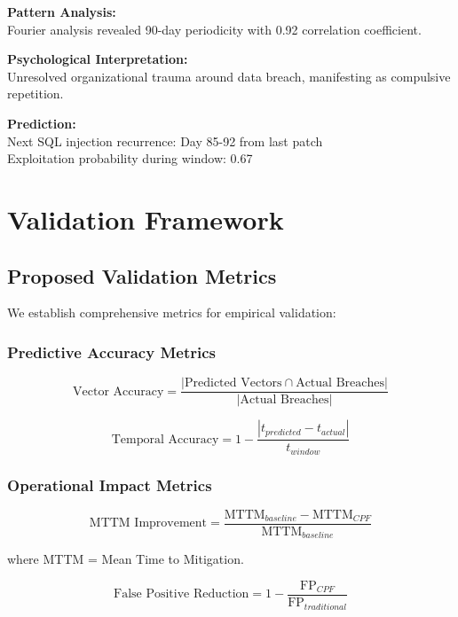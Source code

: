 \documentclass[11pt,a4paper]{article}
\begin{document}
\textbf{Pattern Analysis:}\\
Fourier analysis revealed 90-day periodicity with 0.92 correlation coefficient.

\textbf{Psychological Interpretation:}\\
Unresolved organizational trauma around data breach, manifesting as compulsive repetition.

\textbf{Prediction:}\\
Next SQL injection recurrence: Day 85-92 from last patch\\
Exploitation probability during window: 0.67

\section{Validation Framework}

\subsection{Proposed Validation Metrics}

We establish comprehensive metrics for empirical validation:

\subsubsection{Predictive Accuracy Metrics}

\begin{equation}
\text{Vector Accuracy} = \frac{|\text{Predicted Vectors} \cap \text{Actual Breaches}|}{|\text{Actual Breaches}|}
\end{equation}

\begin{equation}
\text{Temporal Accuracy} = 1 - \frac{|t_{predicted} - t_{actual}|}{t_{window}}
\end{equation}

\subsubsection{Operational Impact Metrics}

\begin{equation}
\text{MTTM Improvement} = \frac{\text{MTTM}_{baseline} - \text{MTTM}_{CPF}}{\text{MTTM}_{baseline}}
\end{equation}

where MTTM = Mean Time to Mitigation.

\begin{equation}
\text{False Positive Reduction} = 1 - \frac{\text{FP}_{CPF}}{\text{FP}_{traditional}}
\end{equation}
\end{document}

